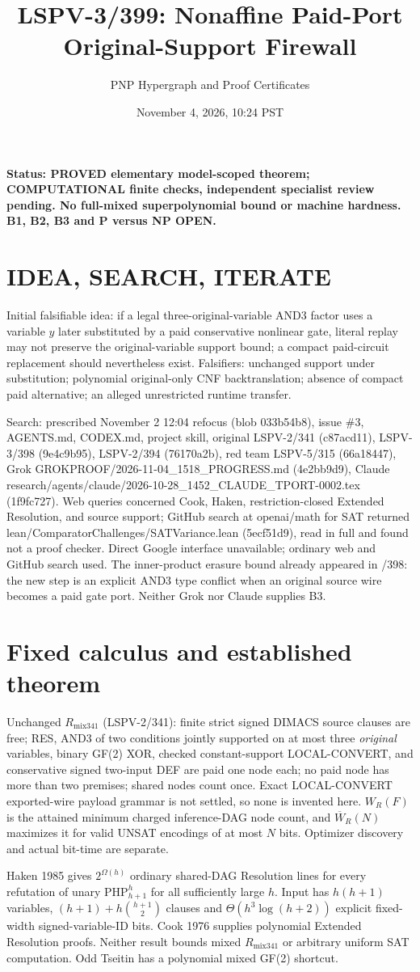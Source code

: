 \documentclass[11pt]{article}
\title{LSPV-3/399: Nonaffine Paid-Port Original-Support Firewall}
\author{PNP Hypergraph and Proof Certificates}
\date{November 4, 2026, 10:24 PST}
\begin{document}
\maketitle
\noindent\textbf{Status: PROVED elementary model-scoped theorem; COMPUTATIONAL finite checks, independent specialist review pending. No full-mixed superpolynomial bound or machine hardness. B1, B2, B3 and P versus NP OPEN.}
\section*{IDEA, SEARCH, ITERATE}
\noindent Initial falsifiable idea: if a legal three-original-variable AND3 factor uses a variable $y$ later substituted by a paid conservative nonlinear gate, literal replay may not preserve the original-variable support bound; a compact paid-circuit replacement should nevertheless exist. Falsifiers: unchanged support under substitution; polynomial original-only CNF backtranslation; absence of compact paid alternative; an alleged unrestricted runtime transfer.
\par Search: prescribed November 2 12:04 refocus (blob 033b54b8), issue \#3, AGENTS.md, CODEX.md, project skill, original LSPV-2/341 (c87acd11), LSPV-3/398 (9e4c9b95), LSPV-2/394 (76170a2b), red team LSPV-5/315 (66a18447), Grok GROKPROOF/2026-11-04\_1518\_PROGRESS.md (4e2bb9d9), Claude research/agents/claude/2026-10-28\_1452\_CLAUDE\_TPORT-0002.tex (1f9fc727). Web queries concerned Cook, Haken, restriction-closed Extended Resolution, and source support; GitHub search at openai/math for SAT returned lean/ComparatorChallenges/SATVariance.lean (5ecf51d9), read in full and found not a proof checker. Direct Google interface unavailable; ordinary web and GitHub search used. The inner-product erasure bound already appeared in /398: the new step is an explicit AND3 type conflict when an original source wire becomes a paid gate port. Neither Grok nor Claude supplies B3.
\section*{Fixed calculus and established theorem}
Unchanged $R_{\mathrm{mix341}}$ (LSPV-2/341): finite strict signed DIMACS source clauses are free; RES, AND3 of two conditions jointly supported on at most three \emph{original} variables, binary GF(2) XOR, checked constant-support LOCAL-CONVERT, and conservative signed two-input DEF are paid one node each; no paid node has more than two premises; shared nodes count once. Exact LOCAL-CONVERT exported-wire payload grammar is not settled, so none is invented here. $W_R(F)$ is the attained minimum charged inference-DAG node count, and $\overline W_R(N)$ maximizes it for valid UNSAT encodings of at most $N$ bits. Optimizer discovery and actual bit-time are separate.
\par Haken 1985 gives $2^{\Omega(h)}$ ordinary shared-DAG Resolution lines for every refutation of unary $\mathrm{PHP}_{h+1}^{h}$ for all sufficiently large $h$. Input has $h(h+1)$ variables, $(h+1)+h\binom{h+1}{2}$ clauses and $\Theta(h^3\log(h+2))$ explicit fixed-width signed-variable-ID bits. Cook 1976 supplies polynomial Extended Resolution proofs. Neither result bounds mixed $R_{\mathrm{mix341}}$ or arbitrary uniform SAT computation. Odd Tseitin has a polynomial mixed GF(2) shortcut.
\end{document}
